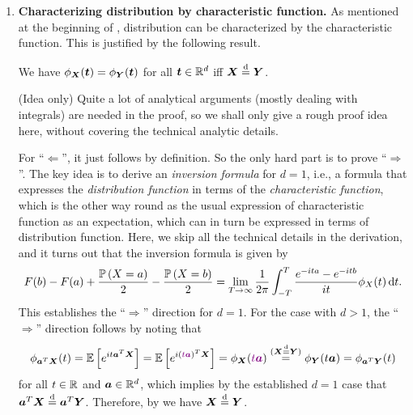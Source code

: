 \begin{enumerate}
\begin{pf}
``\(\Leftarrow\)'': The idea is similar. Fix any \(\vect{a}\in\R^{d}\) and assume
\(\vect{a}^{T}\vect{X}\eqd\vect{a}^{T}\vect{Y}\). Taking
\(\vect{X}_n=\vect{X}\)
for every \(n\in\N\), we have
\(\vect{a}^{T}\vect{X}_n\tod \vect{a}^{T}\vect{X}\)
and \(\vect{a}^{T}\vect{X}_n\tod \vect{a}^{T}\vect{Y}\). Hence,
applying  twice yields \(\vect{X}_n\tod
\vect{X}\) and \(\vect{X}_n\tod\vect{Y}\)
for all \(\vect{a}\in\R^{d}\). Due to the uniqueness of limiting distribution
(), we must then have
\(\vect{X}\eqd \vect{Y}\) for all
\(\vect{a}\in\R^{d}\).
\end{pf}
\item \textbf{Characterizing distribution by characteristic function.}
As mentioned at the beginning of , distribution can be
characterized by the characteristic function. This is justified by the
following result.
\begin{theorem}
\label{thm:cf-char-dist}
We have \(\phi_{\bm{X}}(\bm{t})=\phi_{\bm{Y}}(\bm{t})\) for all
\(\bm{t}\in\mathbb{R}^{d}\) iff \(\vect{X}\eqd \vect{Y}\).
\end{theorem}
\begin{pf} (Idea only)
Quite a lot of analytical arguments (mostly dealing with integrals) are needed
in the proof, so we shall only give a rough proof idea here, without covering
the technical analytic details.

For ``\(\Leftarrow\)'', it just follows by definition. So the only hard part is
to prove ``\(\Rightarrow\)''. The key idea is to derive an \emph{inversion
formula} for \(d=1\), i.e., a formula that expresses the \emph{distribution
function} in terms of the \emph{characteristic function}, which is the other
way round as the usual expression of characteristic function as an expectation,
which can in turn be expressed in terms of distribution function.
Here, we skip all the technical details in the derivation, and it turns
out that the inversion formula is given by
\begin{equation}
\label{eq:char-fn-invers-fmla}
F(b)-F(a)+\frac{\prob{X=a}}{2}-\frac{\prob{X=b}}{2}
=\lim_{T\to\infty}\frac{1}{2\pi}\int_{-T}^{T}
\frac{e^{-ita}-e^{-itb}}{it}\phi_{X}(t)\odif{t}.
\end{equation}
This establishes the ``\(\Rightarrow\)'' direction for \(d=1\). For the case
with \(d>1\), the ``\(\Rightarrow\)'' direction follows by noting that
\[
\phi_{\vect{a}^{T}\vect{X}}(t)=\expv{e^{it\vect{a}^{T}\vect{X}}}
=\expv{e^{i(\vc{t\vect{a}})^{T}\vect{X}}}
=\phi_{\vect{X}}(\vc{t\vect{a}})\overset{(\vect{X}\eqd \vect{Y})}{=}
\phi_{\vect{Y}}(t\vect{a})=\phi_{\vect{a}^{T}\vect{Y}}(t)
\]
for all \(t\in\mathbb{R}\) and \(\vect{a}\in\R^{d}\), which implies by the established
\(d=1\) case that \(\vect{a}^{T}\vect{X}\eqd \vect{a}^{T}\vect{Y}\). Therefore,
by  we have \(\vect{X}\eqd \vect{Y}\).
\end{pf}


\end{enumerate}
